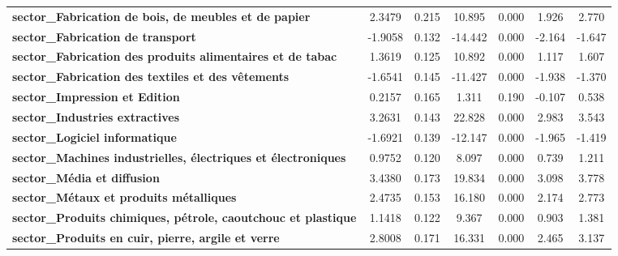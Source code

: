 \begin{center}
\begin{tabular}{lcccccc}
\textbf{sector\_Fabrication de bois, de meubles et de papier}         &       2.3479  &        0.215     &    10.895  &         0.000        &        1.926    &        2.770     \\
\textbf{sector\_Fabrication de transport}                             &      -1.9058  &        0.132     &   -14.442  &         0.000        &       -2.164    &       -1.647     \\
\textbf{sector\_Fabrication des produits alimentaires et de tabac}    &       1.3619  &        0.125     &    10.892  &         0.000        &        1.117    &        1.607     \\
\textbf{sector\_Fabrication des textiles et des vêtements}            &      -1.6541  &        0.145     &   -11.427  &         0.000        &       -1.938    &       -1.370     \\
\textbf{sector\_Impression et Edition}                                &       0.2157  &        0.165     &     1.311  &         0.190        &       -0.107    &        0.538     \\
\textbf{sector\_Industries extractives}                               &       3.2631  &        0.143     &    22.828  &         0.000        &        2.983    &        3.543     \\
\textbf{sector\_Logiciel informatique}                                &      -1.6921  &        0.139     &   -12.147  &         0.000        &       -1.965    &       -1.419     \\
\textbf{sector\_Machines industrielles, électriques et électroniques} &       0.9752  &        0.120     &     8.097  &         0.000        &        0.739    &        1.211     \\
\textbf{sector\_Média et diffusion}                                   &       3.4380  &        0.173     &    19.834  &         0.000        &        3.098    &        3.778     \\
\textbf{sector\_Métaux et produits métalliques}                       &       2.4735  &        0.153     &    16.180  &         0.000        &        2.174    &        2.773     \\
\textbf{sector\_Produits chimiques, pétrole, caoutchouc et plastique} &       1.1418  &        0.122     &     9.367  &         0.000        &        0.903    &        1.381     \\
\textbf{sector\_Produits en cuir, pierre, argile et verre}            &       2.8008  &        0.171     &    16.331  &         0.000        &        2.465    &        3.137     \\

\end{tabular}
\end{center}
